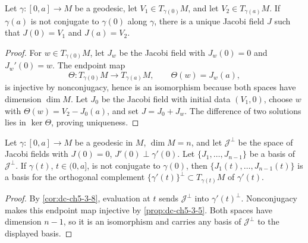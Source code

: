 \begin{proposition}
  \label{prop:dc-ch5-3-9}
  \leanok
  Let $\gamma:[0,a]\to M$ be a geodesic, let
  $V_1\in T_{\gamma(0)}M$, and let $V_2\in T_{\gamma(a)}M$. If $\gamma(a)$ is
  not conjugate to $\gamma(0)$ along $\gamma$, there is a unique Jacobi field
  $J$ such that $J(0)=V_1$ and $J(a)=V_2$.
\end{proposition}
\begin{proof}
  \leanok
  \sketch
  For $w\in T_{\gamma(0)}M$, let $J_w$ be the Jacobi field with
  $J_w(0)=0$ and $J_w'(0)=w$. The endpoint map
  $$
  \Theta:T_{\gamma(0)}M\longrightarrow T_{\gamma(a)}M,\qquad
  \Theta(w)=J_w(a),
  $$
  is injective by nonconjugacy, hence is an isomorphism because both spaces
  have dimension $\dim M$. Let $J_0$ be the Jacobi field with initial data
  $(V_1,0)$, choose $w$ with $\Theta(w)=V_2-J_0(a)$, and set $J=J_0+J_w$.
  The difference of two solutions lies in $\ker\Theta$, proving uniqueness.
\end{proof}

\begin{corollary}
  \label{cor:dc-ch5-3-10}
  \leanok
  Let $\gamma:[0,a]\to M$ be a geodesic in $M$, $\dim M=n$, and let
  $\mathcal{J}^\perp$ be the space of Jacobi fields with $J(0)=0$,
  $J'(0)\perp\gamma'(0)$. Let $\{J_1,\dots,J_{n-1}\}$ be a basis of
  $\mathcal{J}^\perp$. If $\gamma(t)$, $t\in(0,a]$, is not conjugate to $\gamma(0)$,
  then $\{J_1(t),\dots,J_{n-1}(t)\}$ is a basis for the orthogonal complement
  $\{\gamma'(t)\}^\perp\subset T_{\gamma(t)}M$ of $\gamma'(t)$.
\end{corollary}
\begin{proof}

  \sketch
  By \cref{cor:dc-ch5-3-8}, evaluation at $t$ sends
  $\mathcal J^\perp$ into $\gamma'(t)^\perp$. Nonconjugacy makes this endpoint
  map injective by \cref{prop:dc-ch5-3-5}. Both spaces have dimension $n-1$,
  so it is an isomorphism and carries any basis of $\mathcal J^\perp$ to the
  displayed basis.
\end{proof}
